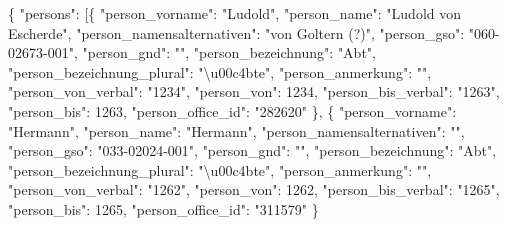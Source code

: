 \documentclass[ngerman,]{scrreprt}
\newenvironment{Shaded}{}{}
\newcommand{\DataTypeTok}[1]{\textcolor[rgb]{0.56,0.13,0.00}{#1}}
\newcommand{\DecValTok}[1]{\textcolor[rgb]{0.25,0.63,0.44}{#1}}
\newcommand{\CharTok}[1]{\textcolor[rgb]{0.25,0.44,0.63}{#1}}
\newcommand{\StringTok}[1]{\textcolor[rgb]{0.25,0.44,0.63}{#1}}
\newcommand{\OtherTok}[1]{\textcolor[rgb]{0.00,0.44,0.13}{#1}}
\newcommand{\FunctionTok}[1]{\textcolor[rgb]{0.02,0.16,0.49}{#1}}
\begin{document}
\begin{Shaded}
\begin{Highlighting}[]
\FunctionTok{\{}
    \DataTypeTok{"persons"}\FunctionTok{:} \OtherTok{[}\FunctionTok{\{}
        \DataTypeTok{"person_vorname"}\FunctionTok{:} \StringTok{"Ludold"}\FunctionTok{,}
        \DataTypeTok{"person_name"}\FunctionTok{:} \StringTok{"Ludold von Escherde"}\FunctionTok{,}
        \DataTypeTok{"person_namensalternativen"}\FunctionTok{:} \StringTok{"von Goltern (?)"}\FunctionTok{,}
        \DataTypeTok{"person_gso"}\FunctionTok{:} \StringTok{"060-02673-001"}\FunctionTok{,}
        \DataTypeTok{"person_gnd"}\FunctionTok{:} \StringTok{""}\FunctionTok{,}
        \DataTypeTok{"person_bezeichnung"}\FunctionTok{:} \StringTok{"Abt"}\FunctionTok{,}
        \DataTypeTok{"person_bezeichnung_plural"}\FunctionTok{:} \StringTok{"}\CharTok{\textbackslash{}u00c4}\StringTok{bte"}\FunctionTok{,}
        \DataTypeTok{"person_anmerkung"}\FunctionTok{:} \StringTok{""}\FunctionTok{,}
        \DataTypeTok{"person_von_verbal"}\FunctionTok{:} \StringTok{"1234"}\FunctionTok{,}
        \DataTypeTok{"person_von"}\FunctionTok{:} \DecValTok{1234}\FunctionTok{,}
        \DataTypeTok{"person_bis_verbal"}\FunctionTok{:} \StringTok{"1263"}\FunctionTok{,}
        \DataTypeTok{"person_bis"}\FunctionTok{:} \DecValTok{1263}\FunctionTok{,}
        \DataTypeTok{"person_office_id"}\FunctionTok{:} \StringTok{"282620"}
    \FunctionTok{\}}\OtherTok{,} \FunctionTok{\{}
        \DataTypeTok{"person_vorname"}\FunctionTok{:} \StringTok{"Hermann"}\FunctionTok{,}
        \DataTypeTok{"person_name"}\FunctionTok{:} \StringTok{"Hermann"}\FunctionTok{,}
        \DataTypeTok{"person_namensalternativen"}\FunctionTok{:} \StringTok{""}\FunctionTok{,}
        \DataTypeTok{"person_gso"}\FunctionTok{:} \StringTok{"033-02024-001"}\FunctionTok{,}
        \DataTypeTok{"person_gnd"}\FunctionTok{:} \StringTok{""}\FunctionTok{,}
        \DataTypeTok{"person_bezeichnung"}\FunctionTok{:} \StringTok{"Abt"}\FunctionTok{,}
        \DataTypeTok{"person_bezeichnung_plural"}\FunctionTok{:} \StringTok{"}\CharTok{\textbackslash{}u00c4}\StringTok{bte"}\FunctionTok{,}
        \DataTypeTok{"person_anmerkung"}\FunctionTok{:} \StringTok{""}\FunctionTok{,}
        \DataTypeTok{"person_von_verbal"}\FunctionTok{:} \StringTok{"1262"}\FunctionTok{,}
        \DataTypeTok{"person_von"}\FunctionTok{:} \DecValTok{1262}\FunctionTok{,}
        \DataTypeTok{"person_bis_verbal"}\FunctionTok{:} \StringTok{"1265"}\FunctionTok{,}
        \DataTypeTok{"person_bis"}\FunctionTok{:} \DecValTok{1265}\FunctionTok{,}
        \DataTypeTok{"person_office_id"}\FunctionTok{:} \StringTok{"311579"}
    \FunctionTok{\}}
\end{Highlighting}
\end{Shaded}
\end{document}
